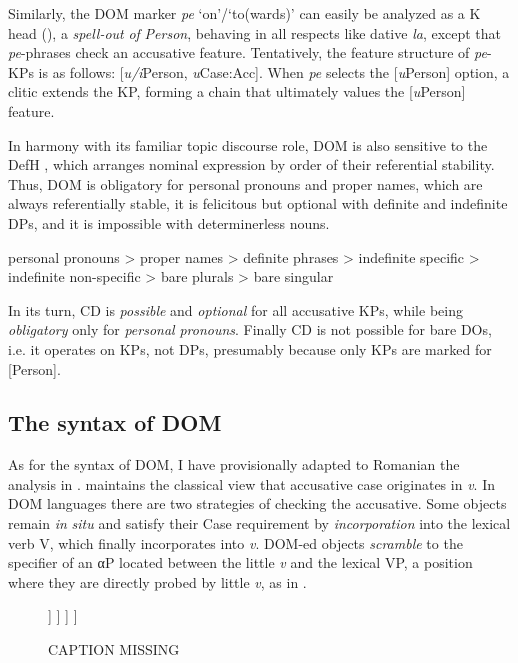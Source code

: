 \documentclass[output=paper,modfonts,nonflat,newtxmath]{langsci/langscibook}
\begin{document}
Similarly, the DOM marker \textit{pe} ‘on’/‘to(wards)’ can easily be analyzed as a K head (\citealt{López2012, HillMardale2017}), a \textit{spell-out} \textit{of} \textit{Person}, behaving in all respects like dative \textit{la}, except that \textit{pe}{}-phrases check an accusative feature. Tentatively, the feature structure of \textit{pe}-KPs is as follows: [\textit{u/i}Person, \textit{u}Case:Acc]. When \textit{pe} selects the [\textit{u}Person] option, a clitic extends the KP, forming a chain that ultimately values the [\textit{u}Person] feature. 

In harmony with its familiar topic discourse role, DOM is also sensitive to the DefH , which arranges nominal expression by order of their referential stability. Thus, DOM is obligatory for personal pronouns and proper names, which are always referentially stable, it is felicitous but optional with definite and indefinite DPs, and it is impossible with determinerless nouns.

\ea%
      \label{ex:cornilescu:21}
       personal pronouns > proper names > definite phrases > indefinite specific > indefinite non-specific  > bare plurals > bare singular
      \z

In its turn, CD is \textit{possible} and \textit{optional} for all accusative KPs, while being \textit{obligatory} only for \textit{personal} \textit{pronouns}. Finally CD is not possible for bare DOs, i.e. it operates on KPs, not DPs, presumably because only KPs are marked for [Person].

\subsection{{The} {syntax} {of} {DOM}}

As for the syntax of DOM, I have provisionally adapted to Romanian the analysis in \citet{López2012}. \citeauthor{López2012} maintains the classical view that accusative case originates in \textit{v}. In DOM languages there are two strategies of checking the accusative. Some objects remain \textit{in} \textit{situ} and satisfy their Case requirement by \textit{incorporation} into the lexical verb V, which finally incorporates into \textit{v}. DOM-ed objects \textit{scramble} to the specifier of an αP located between the little \textit{v} and the lexical VP, a position where they are directly probed by little \textit{v}, as in .

                  
\begin{figure}%
	\begin{forest}
		[\textit{v}P
			[Subject
			]
			[\textit{v}'
				[\textit{v}]
				[αP
					[α]
					[VP
						[V]
						[DO]
					]
				]
			]
		]
	\end{forest}
	\caption{\label{fig:cornilescu:4} CAPTION  MISSING}
\end{figure}
\end{document}
